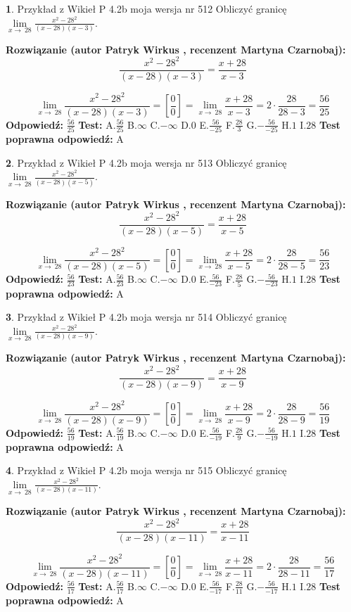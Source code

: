 \documentclass[12pt, a4paper]{article}
\theoremstyle{definition} %
\newtheorem{zad}{}
\newcommand{\zadStart}[1]{\begin{zad}#1\newline}
\newcommand{\zadStop}{\end{zad}}
\newcommand{\rozwStart}[2]{\noindent \textbf{Rozwiązanie (autor #1 , recenzent #2): }\newline}
\newcommand{\rozwStop}{\newline}
\newcommand{\odpStart}{\noindent \textbf{Odpowiedź:}\newline}
\newcommand{\odpStop}{\newline}
\newcommand{\testStart}{\noindent \textbf{Test:}\newline}
\newcommand{\testStop}{\newline}
\newcommand{\kluczStart}{\noindent \textbf{Test poprawna odpowiedź:}\newline}
\newcommand{\kluczStop}{\newline}
\begin{document}
\zadStart{Przykład z Wikieł P 4.2b moja wersja nr 512}
Obliczyć granicę $\lim\limits_{x\to\ 28}\frac{x^{2}-28^{2}}{(x-28)(x-3)}$.
\zadStop
\rozwStart{Patryk Wirkus}{Martyna Czarnobaj}
$$\frac{x^{2}-28^{2}}{(x-28)(x-3)}=\frac{x+28}{x-3}$$

$$\lim\limits_{x\to\ 28}\frac{x^{2}-28^{2}}{(x-28)(x-3)}=[\frac{0}{0}]=\lim\limits_{x\to\ 28}\frac{x+28}{x-3}=2 \cdot \frac{28}{28-3} = \frac{56}{25}$$
\rozwStop
\odpStart
$\frac{56}{25}$
\odpStop
\testStart
A.$\frac{56}{25}$
B.$\infty$
C.$-\infty$
D.$0$
E.$\frac{56}{-25}$
F.$\frac{28}{3}$
G.$-\frac{56}{-25}$
H.$1$
I.$28$
\testStop
\kluczStart
A
\kluczStop



\zadStart{Przykład z Wikieł P 4.2b moja wersja nr 513}
Obliczyć granicę $\lim\limits_{x\to\ 28}\frac{x^{2}-28^{2}}{(x-28)(x-5)}$.
\zadStop
\rozwStart{Patryk Wirkus}{Martyna Czarnobaj}
$$\frac{x^{2}-28^{2}}{(x-28)(x-5)}=\frac{x+28}{x-5}$$

$$\lim\limits_{x\to\ 28}\frac{x^{2}-28^{2}}{(x-28)(x-5)}=[\frac{0}{0}]=\lim\limits_{x\to\ 28}\frac{x+28}{x-5}=2 \cdot \frac{28}{28-5} = \frac{56}{23}$$
\rozwStop
\odpStart
$\frac{56}{23}$
\odpStop
\testStart
A.$\frac{56}{23}$
B.$\infty$
C.$-\infty$
D.$0$
E.$\frac{56}{-23}$
F.$\frac{28}{5}$
G.$-\frac{56}{-23}$
H.$1$
I.$28$
\testStop
\kluczStart
A
\kluczStop



\zadStart{Przykład z Wikieł P 4.2b moja wersja nr 514}
Obliczyć granicę $\lim\limits_{x\to\ 28}\frac{x^{2}-28^{2}}{(x-28)(x-9)}$.
\zadStop
\rozwStart{Patryk Wirkus}{Martyna Czarnobaj}
$$\frac{x^{2}-28^{2}}{(x-28)(x-9)}=\frac{x+28}{x-9}$$

$$\lim\limits_{x\to\ 28}\frac{x^{2}-28^{2}}{(x-28)(x-9)}=[\frac{0}{0}]=\lim\limits_{x\to\ 28}\frac{x+28}{x-9}=2 \cdot \frac{28}{28-9} = \frac{56}{19}$$
\rozwStop
\odpStart
$\frac{56}{19}$
\odpStop
\testStart
A.$\frac{56}{19}$
B.$\infty$
C.$-\infty$
D.$0$
E.$\frac{56}{-19}$
F.$\frac{28}{9}$
G.$-\frac{56}{-19}$
H.$1$
I.$28$
\testStop
\kluczStart
A
\kluczStop



\zadStart{Przykład z Wikieł P 4.2b moja wersja nr 515}
Obliczyć granicę $\lim\limits_{x\to\ 28}\frac{x^{2}-28^{2}}{(x-28)(x-11)}$.
\zadStop
\rozwStart{Patryk Wirkus}{Martyna Czarnobaj}
$$\frac{x^{2}-28^{2}}{(x-28)(x-11)}=\frac{x+28}{x-11}$$

$$\lim\limits_{x\to\ 28}\frac{x^{2}-28^{2}}{(x-28)(x-11)}=[\frac{0}{0}]=\lim\limits_{x\to\ 28}\frac{x+28}{x-11}=2 \cdot \frac{28}{28-11} = \frac{56}{17}$$
\rozwStop
\odpStart
$\frac{56}{17}$
\odpStop
\testStart
A.$\frac{56}{17}$
B.$\infty$
C.$-\infty$
D.$0$
E.$\frac{56}{-17}$
F.$\frac{28}{11}$
G.$-\frac{56}{-17}$
H.$1$
I.$28$
\testStop
\kluczStart
A
\kluczStop
\end{document}
